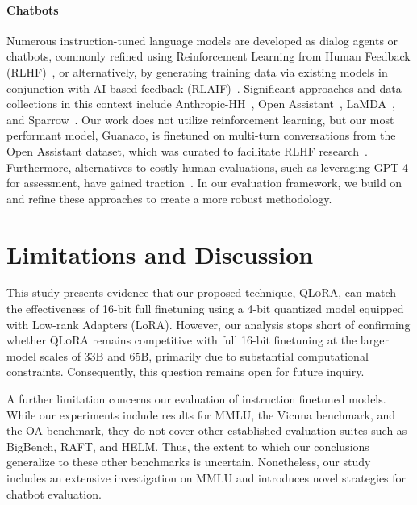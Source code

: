 \paragraph{Chatbots} Numerous instruction-tuned language models are developed as dialog agents or chatbots, commonly refined using Reinforcement Learning from Human Feedback (RLHF)~\citep{christiano2017deep}, or alternatively, by generating training data via existing models in conjunction with AI-based feedback (RLAIF)~\citep{bai2022constitutional}. Significant approaches and data collections in this context include Anthropic-HH~\citep{askell2021general,bai2022training}, Open Assistant~\citep{kopf2023openassistant}, LaMDA~\citep{thoppilan2022lamda}, and Sparrow~\citep{glaese2022improving}. Our work does not utilize reinforcement learning, but our most performant model, Guanaco, is finetuned on multi-turn conversations from the Open Assistant dataset, which was curated to facilitate RLHF research~\citep{kopf2023openassistant}. Furthermore, alternatives to costly human evaluations, such as leveraging GPT-4 for assessment, have gained traction~\citep{vicuna2023,peng2023instruction}. In our evaluation framework, we build on and refine these approaches to create a more robust methodology.

\section{Limitations and Discussion}

This study presents evidence that our proposed technique, \textsc{QLoRA}, can match the effectiveness of 16-bit full finetuning using a 4-bit quantized model equipped with Low-rank Adapters (LoRA). However, our analysis stops short of confirming whether \textsc{QLoRA} remains competitive with full 16-bit finetuning at the larger model scales of 33B and 65B, primarily due to substantial computational constraints. Consequently, this question remains open for future inquiry.

A further limitation concerns our evaluation of instruction finetuned models. While our experiments include results for MMLU, the Vicuna benchmark, and the OA benchmark, they do not cover other established evaluation suites such as BigBench, RAFT, and HELM. Thus, the extent to which our conclusions generalize to these other benchmarks is uncertain. Nonetheless, our study includes an extensive investigation on MMLU and introduces novel strategies for chatbot evaluation.

